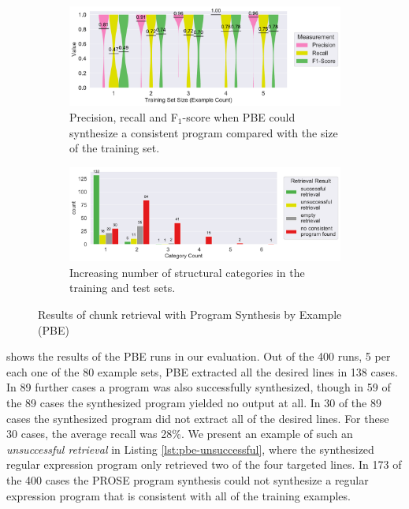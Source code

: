 \begin{figure}
\begin{subfigure}[!t]{\textwidth}
		\centering
		\includegraphics[width=\textwidth, clip]{img/big-study/recall-precision-examplecount-sythesisworked-PBE.pdf}
		\caption{Precision, recall and F$_{1}$-score when PBE could synthesize a consistent program compared with the size of the training set.}
		\label{fig:recall-precision-examplecount-sythesisworked-PBE}
\end{subfigure}

\begin{subfigure}[!t]{\textwidth}
		\centering
		\includegraphics[width=\textwidth, clip]{img/big-study/failure-reason-categorycount-PBE.pdf}
		\caption{Increasing number of structural categories in the training and test sets.}
		\label{fig:failure-reason-categorycount-PBE}
\end{subfigure}

\caption{Results of chunk retrieval with Program Synthesis by Example (PBE)}
\end{figure}

 shows the results of the PBE runs in our evaluation.
Out of the 400 runs, 5 per each one of the 80 example sets, PBE extracted all the desired lines in 138 cases.
In 89 further cases a program was also successfully synthesized, though in 59 of the 89 cases the synthesized program yielded no output at all.
In 30 of the 89 cases the synthesized program did not extract all of the desired lines.
For these 30 cases, the average recall was 28\%.
We present an example of such an \emph{unsuccessful retrieval} in Listing \ref{lst:pbe-unsuccessful}, where the synthesized regular expression program only retrieved two of the four targeted lines.
In 173 of the 400 cases the PROSE program synthesis could not synthesize a regular expression program that is consistent with all of the training examples.

